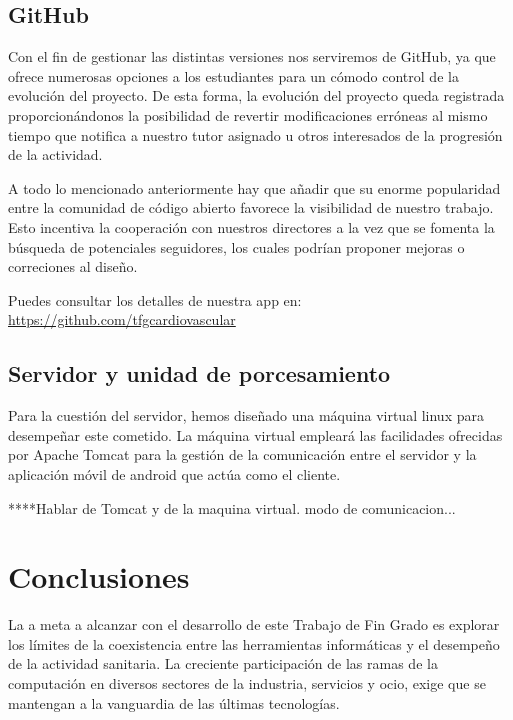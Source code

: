 \documentclass[11pt,spanish,
		listoftables,listoffigures]
		{tfgplantilla}
\begin{document}
\section {GitHub}

Con el fin de gestionar las distintas versiones nos serviremos de GitHub, ya que ofrece numerosas opciones a los estudiantes para un cómodo control de la evolución del proyecto. De esta forma, la evolución del proyecto queda registrada proporcionándonos la posibilidad de revertir modificaciones erróneas al mismo tiempo que notifica a nuestro tutor asignado u otros interesados de la progresión de la actividad. 

A todo lo mencionado anteriormente hay que añadir que su enorme popularidad entre la comunidad de código abierto favorece la visibilidad de nuestro trabajo. Esto incentiva la cooperación con nuestros directores a la vez que se fomenta la búsqueda de potenciales seguidores, los cuales podrían proponer mejoras o correciones al diseño.

\noindent Puedes consultar los detalles de nuestra app en: \url{https://github.com/tfgcardiovascular}

\section {Servidor y unidad de porcesamiento}

Para la cuestión del servidor, hemos diseñado una máquina virtual linux para desempeñar este cometido. La máquina virtual empleará las facilidades ofrecidas por Apache Tomcat para la gestión de la comunicación entre el servidor y la aplicación móvil de android que actúa como el cliente.

****Hablar de Tomcat y de la maquina virtual. modo de comunicacion...

\chapter{Conclusiones}

La a meta a alcanzar con el desarrollo de este Trabajo de Fin Grado es explorar los límites de la coexistencia entre las herramientas informáticas y el desempeño de la actividad sanitaria. La creciente participación de las ramas de la computación en diversos sectores de la industria, servicios y ocio, exige que se mantengan a la vanguardia de las últimas tecnologías.
\end{document}
